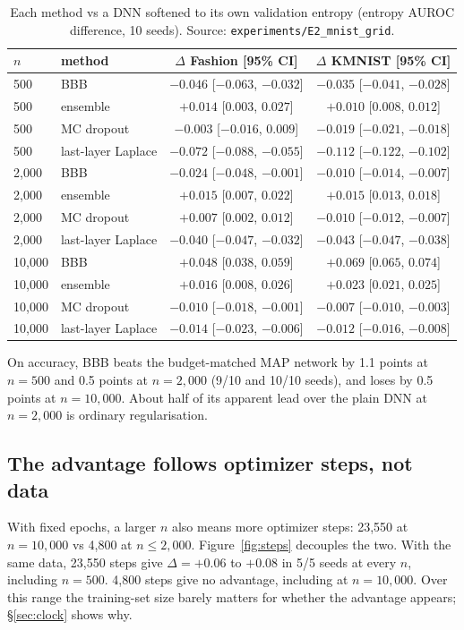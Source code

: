 \documentclass[11pt]{article}
\begin{document}
\begin{table}[!htb]
\centering\small
\begin{tabular}{llcc}
\toprule
$n$ & method & $\Delta$ Fashion [95\% CI] & $\Delta$ KMNIST [95\% CI] \\
\midrule
500 & BBB & $-0.046$ [$-0.063$, $-0.032$] & $-0.035$ [$-0.041$, $-0.028$] \\
500 & ensemble & $+0.014$ [$0.003$, $0.027$] & $+0.010$ [$0.008$, $0.012$] \\
500 & MC dropout & $-0.003$ [$-0.016$, $0.009$] & $-0.019$ [$-0.021$, $-0.018$] \\
500 & last-layer Laplace & $-0.072$ [$-0.088$, $-0.055$] & $-0.112$ [$-0.122$, $-0.102$] \\
\midrule
2{,}000 & BBB & $-0.024$ [$-0.048$, $-0.001$] & $-0.010$ [$-0.014$, $-0.007$] \\
2{,}000 & ensemble & $+0.015$ [$0.007$, $0.022$] & $+0.015$ [$0.013$, $0.018$] \\
2{,}000 & MC dropout & $+0.007$ [$0.002$, $0.012$] & $-0.010$ [$-0.012$, $-0.007$] \\
2{,}000 & last-layer Laplace & $-0.040$ [$-0.047$, $-0.032$] & $-0.043$ [$-0.047$, $-0.038$] \\
\midrule
10{,}000 & BBB & $\mathbf{+0.048}$ [$0.038$, $0.059$] & $\mathbf{+0.069}$ [$0.065$, $0.074$] \\
10{,}000 & ensemble & $+0.016$ [$0.008$, $0.026$] & $+0.023$ [$0.021$, $0.025$] \\
10{,}000 & MC dropout & $-0.010$ [$-0.018$, $-0.001$] & $-0.007$ [$-0.010$, $-0.003$] \\
10{,}000 & last-layer Laplace & $-0.014$ [$-0.023$, $-0.006$] & $-0.012$ [$-0.016$, $-0.008$] \\
\bottomrule
\end{tabular}
\caption{Each method vs a DNN softened to its own validation entropy (entropy
AUROC difference, 10 seeds). Source: \texttt{experiments/E2\_mnist\_grid}.}
\label{tab:grid}
\end{table}

On accuracy, BBB beats the budget-matched MAP network by 1.1 points at
$n=500$ and 0.5 points at $n=2{,}000$ (9/10 and 10/10 seeds), and loses by 0.5
points at $n=10{,}000$. About half of its apparent lead over the plain DNN at
$n=2{,}000$ is ordinary regularisation.

\subsection{The advantage follows optimizer steps, not data}\label{sec:steps}
With fixed epochs, a larger $n$ also means more optimizer steps: 23{,}550 at
$n=10{,}000$ vs 4{,}800 at $n\le 2{,}000$. Figure~\ref{fig:steps} decouples
the two. With the same data, 23{,}550 steps give $\Delta=+0.06$ to $+0.08$ in
5/5 seeds at every $n$, including $n=500$. 4{,}800 steps give no advantage,
including at $n=10{,}000$. Over this range the training-set size barely
matters for whether the advantage appears; \S\ref{sec:clock} shows why.
\end{document}
